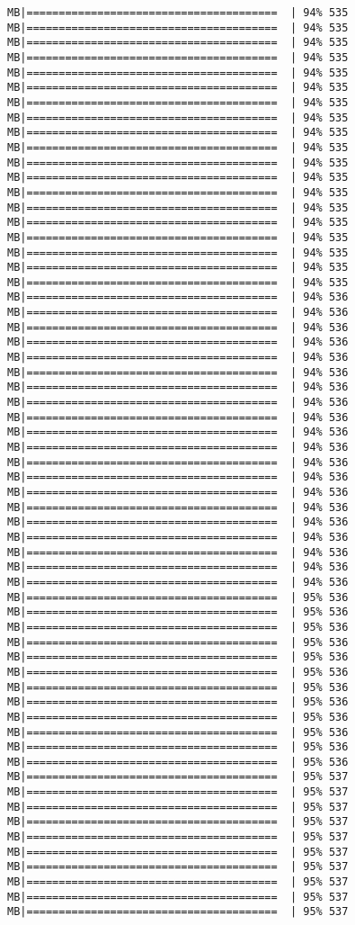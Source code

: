 \documentclass[
]{article}
\begin{document}
\begin{verbatim}
MB|=======================================  | 94% 535 MB|=======================================  | 94% 535 MB|=======================================  | 94% 535 MB|=======================================  | 94% 535 MB|=======================================  | 94% 535 MB|=======================================  | 94% 535 MB|=======================================  | 94% 535 MB|=======================================  | 94% 535 MB|=======================================  | 94% 535 MB|=======================================  | 94% 535 MB|=======================================  | 94% 535 MB|=======================================  | 94% 535 MB|=======================================  | 94% 535 MB|=======================================  | 94% 535 MB|=======================================  | 94% 535 MB|=======================================  | 94% 535 MB|=======================================  | 94% 535 MB|=======================================  | 94% 535 MB|=======================================  | 94% 535 MB|=======================================  | 94% 536 MB|=======================================  | 94% 536 MB|=======================================  | 94% 536 MB|=======================================  | 94% 536 MB|=======================================  | 94% 536 MB|=======================================  | 94% 536 MB|=======================================  | 94% 536 MB|=======================================  | 94% 536 MB|=======================================  | 94% 536 MB|=======================================  | 94% 536 MB|=======================================  | 94% 536 MB|=======================================  | 94% 536 MB|=======================================  | 94% 536 MB|=======================================  | 94% 536 MB|=======================================  | 94% 536 MB|=======================================  | 94% 536 MB|=======================================  | 94% 536 MB|=======================================  | 94% 536 MB|=======================================  | 94% 536 MB|=======================================  | 94% 536 MB|=======================================  | 95% 536 MB|=======================================  | 95% 536 MB|=======================================  | 95% 536 MB|=======================================  | 95% 536 MB|=======================================  | 95% 536 MB|=======================================  | 95% 536 MB|=======================================  | 95% 536 MB|=======================================  | 95% 536 MB|=======================================  | 95% 536 MB|=======================================  | 95% 536 MB|=======================================  | 95% 536 MB|=======================================  | 95% 536 MB|=======================================  | 95% 537 MB|=======================================  | 95% 537 MB|=======================================  | 95% 537 MB|=======================================  | 95% 537 MB|=======================================  | 95% 537 MB|=======================================  | 95% 537 MB|=======================================  | 95% 537 MB|=======================================  | 95% 537 MB|=======================================  | 95% 537 MB|=======================================  | 95% 537 
\end{verbatim}
\end{document}
